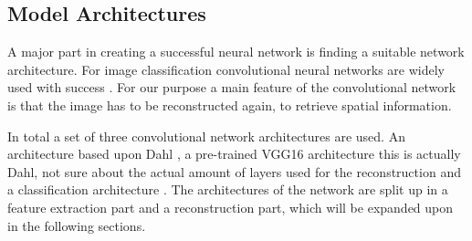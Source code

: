  





 
\subsection{Model Architectures}
A major part in creating a successful neural network is finding a suitable network architecture. For image classification convolutional neural networks are widely used with success \cite{Krizhevsky,Szegedy,Simonyan}. For our purpose a main feature of the convolutional network is that the image has to be reconstructed again, to retrieve spatial information.

{\color{red} 
In total a set of three convolutional network architectures are used. An architecture based upon Dahl \cite{Dahl}, a pre-trained VGG16 \cite{Simonyan} architecture {\color{red} this is actually Dahl,  not sure about the actual amount of layers used for the reconstruction} and a classification architecture \cite{Zhang}. The architectures of the network are split up in a feature extraction part and a reconstruction part, which will be expanded upon in the following sections.}\\ 
\\%


